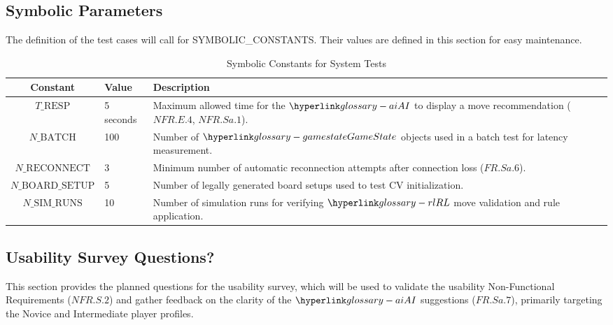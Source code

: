 \documentclass[12pt, titlepage]{article}
\begin{document}
\subsection{Symbolic Parameters}

The definition of the test cases will call for SYMBOLIC\_CONSTANTS.
Their values are defined in this section for easy maintenance.


\begin{table}[h!]
    \centering
    \caption{Symbolic Constants for System Tests}
    \label{tab:symbolic-parameters}
    \begin{tabularx}{\textwidth}{|c|p{2.0cm}|X|}
    \hline
    \textbf{Constant} & \textbf{Value} & \textbf{Description} \\
    \hline
    $T\_\text{RESP}$ & 5 seconds & Maximum allowed time for the $\AI{}$ to display a move recommendation ($\hyperref[NFR.E.4]{NFR.E.4}$, $\hyperref[NFR.Sa.1]{NFR.Sa.1}$). \\
    \hline
    $N\_\text{BATCH}$ & 100 & Number of $\GameState{}$ objects used in a batch test for latency measurement. \\
    \hline
    $N\_\text{RECONNECT}$ & 3 & Minimum number of automatic reconnection attempts after connection loss ($\hyperref[FR.Sa.6]{FR.Sa.6}$). \\
    \hline
    $N\_\text{BOARD\_SETUP}$ & 5 & Number of legally generated board setups used to test CV initialization. \\
    \hline
    $N\_\text{SIM\_RUNS}$ & 10 & Number of simulation runs for verifying $\RL{}$ move validation and rule application. \\
    \hline
    \end{tabularx}
\end{table}



\subsection{Usability Survey Questions?}


This section provides the planned questions for the usability survey, which will be used to validate the usability Non-Functional Requirements ($\hyperref[NFR.S.2]{NFR.S.2}$) and gather feedback on the clarity of the $\AI{}$ suggestions ($\hyperref[FR.Sa.7]{FR.Sa.7}$), primarily targeting the Novice and Intermediate player profiles.
\end{document}

